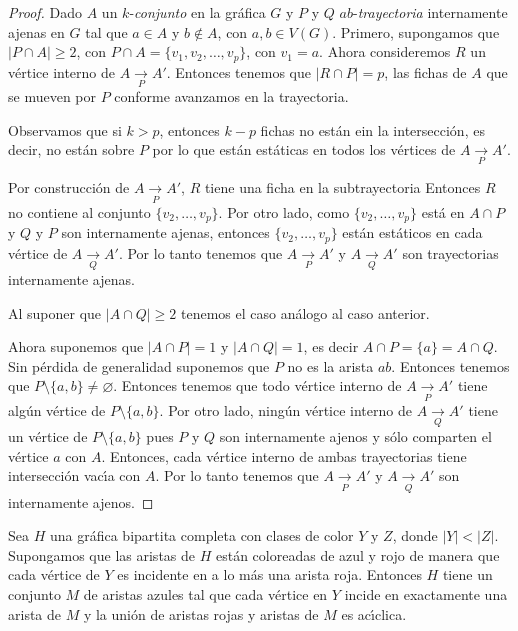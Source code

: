 \begin{proof}
    Dado $A$ un $k$-\textit{conjunto} en la gr\'afica $G$ y $P$ y $Q$
    $ab$-\textit{trayectoria} internamente ajenas en $G$ tal que $a \in A$ y $b
    \notin A$, con $a, b \in V(G)$. Primero, supongamos que $|P \cap A| \geq 2$,
    con $P \cap A = \{v_{1}, v_{2}, \dots , v_{p}\}$, con $v_{1} = a$. Ahora
    consideremos $R$ un v\'ertice interno de $A \xrightarrow[P]{} A'$. Entonces
    tenemos que  $|R \cap P| = p$, las fichas de $A$ que se mueven por $P$
    conforme avanzamos en la trayectoria. 

    Observamos que si $k>p$, entonces $k -p$ fichas no est\'an ein la
    intersecci\'on, es decir, no est\'an sobre $P$ por lo que est\'an
    est\'aticas en todos los v\'ertices de $A \xrightarrow[P]{} A'$. 

    Por construcci\'on de $A \xrightarrow[P]{} A'$, $R$ tiene una ficha en la
    subtrayectoria %
    Entonces $R$ no contiene al conjunto $\{v_{2}, \dots, v_{p}\}$. Por otro
    lado, como $\{v_{2}, \dots, v_{p}\}$ est\'a en $A \cap P$ y $Q$ y $P$ son
    internamente ajenas, entonces $\{v_{2}, \dots, v_{p}\}$ est\'an est\'aticos
    en cada v\'ertice de $A \xrightarrow[Q]{} A'$. Por lo tanto tenemos que $A
    \xrightarrow[P]{} A'$ y $A \xrightarrow[Q]{}A'$ son trayectorias
    internamente ajenas.

    Al suponer que $|A \cap Q| \geq 2$ tenemos el caso an\'alogo al caso
    anterior.

    Ahora suponemos que $|A \cap P| = 1$ y $|A \cap Q| = 1$, es decir $A \cap P
    = \{a\} = A \cap Q$. Sin p\'erdida de generalidad suponemos que $P$ no es la
    arista $ab$. Entonces tenemos que $P \setminus \{a,b\} \neq \varnothing$.
    Entonces tenemos que todo v\'ertice interno de $A \xrightarrow[P]{} A'$
    tiene alg\'un v\'ertice de $P \setminus \{a, b\}$. Por otro lado, ning\'un
    v\'ertice interno de $A \xrightarrow[Q]{} A'$ tiene un v\'ertice de $P
    \setminus \{a, b\}$ pues $P$ y $Q$ son internamente ajenos y s\'olo
    comparten el v\'ertice $a$ con $A$. Entonces, cada v\'ertice interno de
    ambas trayectorias tiene intersecci\'on vac\'\i{}a con $A$. Por lo tanto
    tenemos que $A \xrightarrow[P]{} A'$ y $A \xrightarrow[Q]{} A'$ son
    internamente ajenos.
\end{proof}

\begin{lema}%
\label{lem:segundo}
    Sea $H$ una gr\'afica bipartita completa con clases de color $Y$ y $Z$,
    donde $|Y|<|Z|$. Supongamos que las aristas de $H$ est\'an coloreadas de
    azul y rojo de manera que cada v\'ertice de $Y$ es incidente en a lo m\'as
    una arista roja. Entonces $H$ tiene un conjunto $M$ de aristas azules tal
    que cada v\'ertice en $Y$ incide en exactamente una arista de $M$ y la
    uni\'on de aristas rojas y aristas de $M$ es ac\'\i{}clica.
\end{lema}

